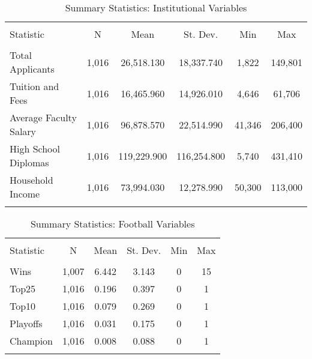 \documentclass[12pt,english]{article}
\begin{document}
\begin{table}
  \centering 
  \caption{Summary Statistics: Institutional Variables} 
  \label{} 
\begin{tabular}{@{\extracolsep{5pt}}lccccc} 
\\[-1.8ex]\hline 
\hline \\[-1.8ex] 
Statistic & \multicolumn{1}{c}{N} & \multicolumn{1}{c}{Mean} & \multicolumn{1}{c}{St. Dev.} & \multicolumn{1}{c}{Min} & \multicolumn{1}{c}{Max} \\ 
\hline \\[-1.8ex] 
Total Applicants & 1,016 & 26,518.130 & 18,337.740 & 1,822 & 149,801 \\ 
Tuition and Fees & 1,016 & 16,465.960 & 14,926.010 & 4,646 & 61,706 \\ 
Average Faculty Salary & 1,016 & 96,878.570 & 22,514.990 & 41,346 & 206,400 \\ 
High School Diplomas & 1,016 & 119,229.900 & 116,254.800 & 5,740 & 431,410 \\ 
Household Income & 1,016 & 73,994.030 & 12,278.990 & 50,300 & 113,000 \\ 
\hline \\[-1.8ex] 
\end{tabular} 
\end{table}

\begin{table}[!htbp] \centering
  \caption{Summary Statistics: Football Variables}
  \label{}
\begin{tabular}{@{\extracolsep{5pt}}lccccc}
\\[-1.8ex]\hline 
\hline \\[-1.8ex]
Statistic & \multicolumn{1}{c}{N} & \multicolumn{1}{c}{Mean} & \multicolumn{1}{c}{St. Dev.} & \multicolumn{1}{c}{Min} & \multicolumn{1}{c}{Max} \\ 
\hline \\[-1.8ex]
Wins & 1,007 & 6.442 & 3.143 & 0 & 15 \\
Top25 & 1,016 & 0.196 & 0.397 & 0 & 1 \\ 
Top10 & 1,016 & 0.079 & 0.269 & 0 & 1 \\
Playoffs & 1,016 & 0.031 & 0.175 & 0 & 1 \\ 
Champion & 1,016 & 0.008 & 0.088 & 0 & 1 \\
\hline \\[-1.8ex]
\end{tabular}
\end{table}
\end{document}
